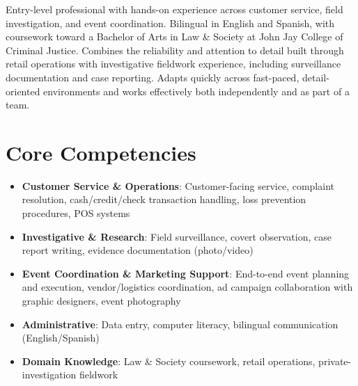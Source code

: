 \documentclass[11pt,a4paper,sans]{moderncv}
\begin{document}
\makecvtitle


\vspace{6pt}
\small{Entry-level professional with hands-on experience across customer service, field investigation, and event coordination. Bilingual in English and Spanish, with coursework toward a Bachelor of Arts in Law \& Society at John Jay College of Criminal Justice. Combines the reliability and attention to detail built through retail operations with investigative fieldwork experience, including surveillance documentation and case reporting. Adapts quickly across fast-paced, detail-oriented environments and works effectively both independently and as part of a team.}


\section{Core Competencies}
\vspace{1pt}
\begin{itemize}

\item \textbf{Customer Service \& Operations}: Customer-facing service, complaint resolution, cash/credit/check transaction handling, loss prevention procedures, POS systems

\item \textbf{Investigative \& Research}: Field surveillance, covert observation, case report writing, evidence documentation (photo/video)

\item \textbf{Event Coordination \& Marketing Support}: End-to-end event planning and execution, vendor/logistics coordination, ad campaign collaboration with graphic designers, event photography

\item \textbf{Administrative}: Data entry, computer literacy, bilingual communication (English/Spanish)

\item \textbf{Domain Knowledge}: Law \& Society coursework, retail operations, private-investigation fieldwork

\end{itemize}
\end{document}
